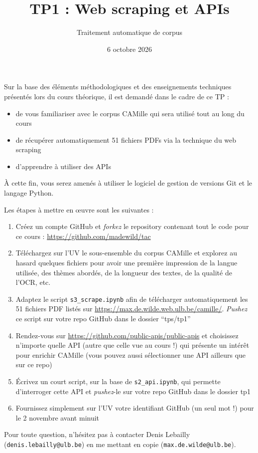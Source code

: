 \documentclass[a4paper,11pt]{article}
\title{TP1 : Web scraping et APIs}
\author{Traitement automatique de corpus}
\date{6 octobre 2026}
\begin{document}
\maketitle
\thispagestyle{empty}

Sur la base des éléments méthodologiques et des enseignements techniques présentés lors du cours théorique, il est demandé dans le cadre de ce TP :

\begin{itemize}
\item de vous familiariser avec le corpus CAMille qui sera utilisé tout au long du cours
\item de récupérer automatiquement 51 fichiers PDFs via la technique du web scraping
\item d'apprendre à utiliser des APIs %
\end{itemize}

À cette fin, vous serez amenés à utiliser le logiciel de gestion de versions Git et le langage Python.

\vspace{0.7cm}

Les étapes à mettre en \oe uvre sont les suivantes :

\begin{enumerate}
\item Créez un compte GitHub et \emph{forkez} le repository contenant tout le code pour ce cours : \url{https://github.com/madewild/tac}
\item Téléchargez sur l'UV le sous-ensemble du corpus CAMille et explorez au hasard quelques fichiers pour avoir une première impression de la langue utilisée, des thèmes abordés, de la longueur des textes, de la qualité de l'OCR, etc.
\item Adaptez le script \texttt{s3\_scrape.ipynb} afin de télécharger automatiquement les 51 fichiers PDF listés sur \url{https://max.de.wilde.web.ulb.be/camille/}. \emph{Pushez} ce script sur votre repo GitHub dans le dossier \enquote{tps/tp1}
\item Rendez-vous sur \url{https://github.com/public-apis/public-apis} et choisissez n'importe quelle API (autre que celle vue au cours !) qui présente un intérêt pour enrichir CAMille (vous pouvez aussi sélectionner une API ailleurs que sur ce repo)
\item Écrivez un court script, sur la base de \texttt{s2\_api.ipynb}, qui permette d'interroger cette API et \emph{pushez}-le sur votre repo GitHub dans le dossier tp1
\item Fournissez simplement sur l'UV votre identifiant GitHub (un seul mot !) pour le 2 novembre avant minuit
\end{enumerate}

Pour toute question, n'hésitez pas à contacter Denis Lebailly  (\texttt{denis.lebailly@ulb.be}) en me mettant en copie (\texttt{max.de.wilde@ulb.be}).
\end{document}
